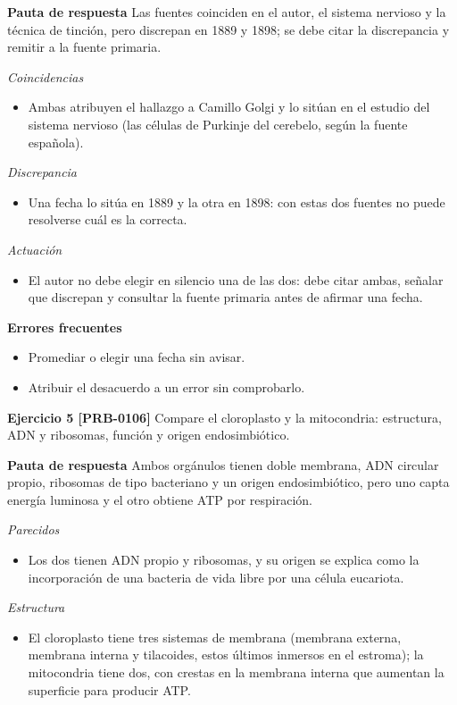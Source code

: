 \documentclass{book}
\begin{document}
\noindent\textbf{Pauta de respuesta}
Las fuentes coinciden en el autor, el sistema nervioso y la técnica de tinción, pero discrepan en 1889 y 1898; se debe citar la discrepancia y remitir a la fuente primaria.


\noindent\textit{Coincidencias}
\begin{itemize}
\item Ambas atribuyen el hallazgo a Camillo Golgi y lo sitúan en el estudio del sistema nervioso (las células de Purkinje del cerebelo, según la fuente española).
\end{itemize}

\noindent\textit{Discrepancia}
\begin{itemize}
\item Una fecha lo sitúa en 1889 y la otra en 1898: con estas dos fuentes no puede resolverse cuál es la correcta.
\end{itemize}

\noindent\textit{Actuación}
\begin{itemize}
\item El autor no debe elegir en silencio una de las dos: debe citar ambas, señalar que discrepan y consultar la fuente primaria antes de afirmar una fecha.
\end{itemize}

\noindent\textbf{Errores frecuentes}
\begin{itemize}
\item Promediar o elegir una fecha sin avisar.
\item Atribuir el desacuerdo a un error sin comprobarlo.
\end{itemize}

\noindent\textbf{Ejercicio 5 [PRB-0106]}
Compare el cloroplasto y la mitocondria: estructura, ADN y ribosomas, función y origen endosimbiótico.


\noindent\textbf{Pauta de respuesta}
Ambos orgánulos tienen doble membrana, ADN circular propio, ribosomas de tipo bacteriano y un origen endosimbiótico, pero uno capta energía luminosa y el otro obtiene ATP por respiración.


\noindent\textit{Parecidos}
\begin{itemize}
\item Los dos tienen ADN propio y ribosomas, y su origen se explica como la incorporación de una bacteria de vida libre por una célula eucariota.
\end{itemize}

\noindent\textit{Estructura}
\begin{itemize}
\item El cloroplasto tiene tres sistemas de membrana (membrana externa, membrana interna y tilacoides, estos últimos inmersos en el estroma); la mitocondria tiene dos, con crestas en la membrana interna que aumentan la superficie para producir ATP.
\end{itemize}
\end{document}
